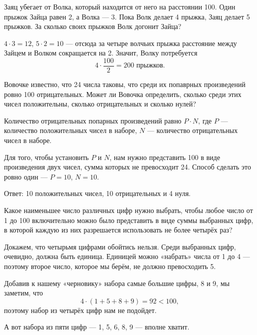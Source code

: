 

\begin{itemize}

	\def\metr#1{\SI{#1}{\text{м}}}
	\itA Заяц убегает от Волка, который находится от него на расстоянии \metr{100}. Один прыжок Зайца равен \metr{2}, а Волка — \metr{3}. Пока Волк делает 4 прыжка, Заяц делает 5 прыжков. За сколько своих прыжков Волк догонит Зайца?
	
	\itr $4 \cdot 3 = 12$, $5 \cdot 2 = 10$ — отсюда за четыре волчьих прыжка расстояние между Зайцем и Волком сокращается на \metr{2}. Значит, Волку потребуется
	$$4 \cdot \frac{100}{2} = 200\text{ прыжков.}$$
	
	\itB Вовочке известно, что 24 числа таковы, что среди их попаврных произведений ровно 100 отрицательных. Может ли Вовочка определить, сколько среди этих чисел положительны, сколько отрицательных и сколько нулей?
	
	\itr Количество отрицательных попарных произведений равно $P \cdot N$, где $P$ — количество положительных чисел в наборе, $N$ — количество отрицательных чисел в наборе.
	
	Для того, чтобы установить $P$ и $N$, нам нужно представить 100 в виде произведения двух чисел, сумма которых не превосходит 24. Способ сделать это ровно один — $P=10$, $N=10$.
	
	Ответ: 10 положительных чисел, 10 отрицательных и 4 нуля.
	
	\itC Какое наименьшее число различных цифр нужно выбрать, чтобы любое число от 1 до 100 включительно можно было представить в виде суммы выбранных цифр, в которой каждую из них разрешается использовать не более четырёх раз?
	
	\itr Докажем, что четырьмя цифрами обойтись нельзя. Среди выбранных цифр, очевидно, должна быть единица. Единицей можно «набрать» числа от 1 до 4 — поэтому второе число, которое мы берём, не должно превосходить 5.
	
	Добавив к нашему «черновику» набора самые большие цифры, 8 и 9, мы заметим, что
	$$4 \cdot (1+5+8+9) = 92 < 100,$$
	поэтому набор из четырёх цифр нам не подойдет.
	
	А вот набора из пяти цифр — 1, 5, 6, 8, 9 — вполне хватит.

\end{itemize}


